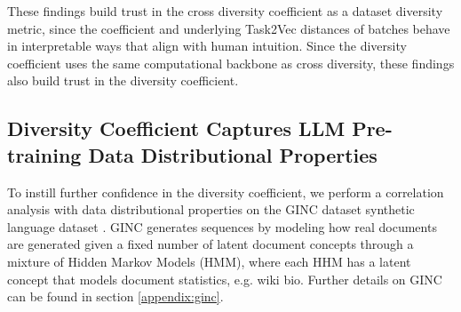 \documentclass[10pt]{article} %
\begin{document}
\begin{itemize}
\end{itemize}
These findings build trust in the cross diversity coefficient as a dataset diversity metric, since the coefficient and underlying Task2Vec distances of batches behave in interpretable ways that align with human intuition. Since the diversity coefficient uses the same computational backbone as cross diversity, these findings also build trust in the diversity coefficient. %


\subsection{Diversity Coefficient Captures LLM Pre-training Data Distributional Properties} \label{body:ginc}
To instill further confidence in the diversity coefficient, we perform a correlation analysis with data distributional properties on the GINC dataset synthetic language dataset \cite{ginc}.
GINC generates sequences by modeling how real documents are generated given a fixed number of latent document concepts through a mixture of Hidden Markov Models (HMM), where each HHM has a latent concept that models document statistics, e.g. wiki bio.
Further details on GINC can be found in section \ref{appendix:ginc}.
\end{document}
